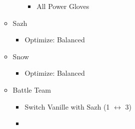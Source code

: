 \begin{multicols}{2}
\begin{menu}
\begin{itemize}
\begin{itemize}
\begin{itemize}
\begin{itemize}
                        \item All Power Gloves
                      \end{itemize}
              \end{itemize}
        \item Sazh
              \begin{itemize}
                \item Optimize: Balanced
              \end{itemize}
        \item Snow
              \begin{itemize}
                \item Optimize: Balanced
              \end{itemize}
      \end{itemize}
      \paradigm
      \begin{itemize}
        \item Battle Team
              \begin{itemize}
                \item Switch Vanille with Sazh (1 $\leftrightarrow$ 3)
                \item {}%
                      {\paradigmline{\com}{\com}{\med}}%
                      {\paradigmline[2]{\textit{\com}}{\textit{\com}}{\textit{(\rav)}}}%
                      {\paradigmline{(\sen)}{\sen}{(\med)}}%
                      {\paradigmline{\syn}{\rav}{\rav}}%
                      {\paradigmline{\rav}{\rav}{\sab}}%
                      {\paradigmline{\rav}{\rav}{\rav}}
              \end{itemize}
      \end{itemize}
    \end{itemize}


\end{menu}
\end{multicols}
